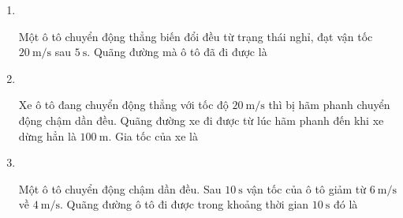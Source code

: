 \begin{enumerate}[label=\bfseries Câu \arabic*:,leftmargin=1.5cm]
\item {}\\
{Một ô tô chuyển động thẳng biến đổi đều từ trạng thái nghỉ, đạt vận tốc $\SI{20}{\meter/\second}$ sau $\SI{5}{\second}$. Quãng đường mà ô tô đã đi được là
}

\item {}\\
{Xe ô tô đang chuyển động thẳng với tốc độ $\SI{20}{\meter/\second}$ thì bị hãm phanh chuyển động chậm dần đều. Quãng đường xe đi được từ lúc hãm phanh đến khi xe dừng hẳn là $\SI{100}{\meter}$. Gia tốc của xe là
}

\item {}\\
{Một ô tô chuyển động chậm dần đều. Sau $\SI{10}{\second}$ vận tốc của ô tô giảm từ $\SI{6}{\meter/\second}$ về $\SI{4}{\meter/\second}$. Quãng đường ô tô đi được trong khoảng thời gian $\SI{10}{\second}$ đó là
	\begin{mcq}(4)
		\item $\SI{70}{\meter}$.
		\item $\SI{50}{\meter}$.
		\item $\SI{40}{\meter}$.
		\item $\SI{100}{\meter}$.
	\end{mcq}

}


\end{enumerate}
